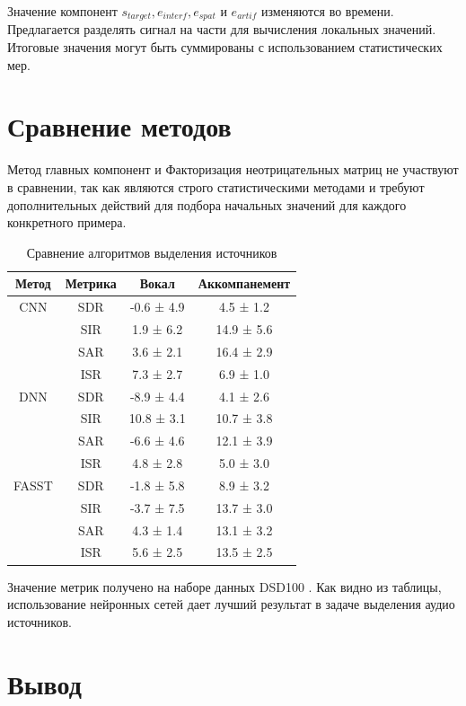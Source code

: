 Значение компонент $s_{target}, e_{interf}, e_{spat}$ и $e_{artif}$ изменяются во времени. Предлагается разделять сигнал на части для вычисления локальных значений. Итоговые значения могут быть суммированы с использованием статистических мер.

\section{Сравнение методов}

Метод главных компонент и Факторизация неотрицательных матриц не участвуют в сравнении, так как являются строго статистическими методами и требуют дополнительных действий для подбора начальных значений для каждого конкретного примера.

\begin{table}[h]
	\caption{\label{tab:canonsummary}Сравнение алгоритмов выделения источников}
	\begin{center}
		\begin{tabular}{|c|c|c|c|}
			\hline
			Метод & Метрика & Вокал & Аккомпанемент \\
			\hline
			CNN & SDR & -0.6 ± 4.9 & 4.5 ± 1.2 \\
				& SIR & 1.9 ± 6.2 & 14.9 ± 5.6 \\
				& SAR & 3.6 ± 2.1 & 16.4 ± 2.9 \\
				& ISR & 7.3 ± 2.7 & 6.9 ± 1.0 \\
			\hline
			DNN & SDR & -8.9 ± 4.4 & 4.1 ± 2.6 \\
			& SIR & 10.8 ± 3.1 & 10.7 ± 3.8 \\
			& SAR & -6.6 ± 4.6 & 12.1 ± 3.9 \\
			& ISR & 4.8 ± 2.8 & 5.0 ± 3.0 \\
			\hline
			FASST & SDR & -1.8 ± 5.8 & 8.9 ± 3.2 \\
			& SIR & -3.7 ± 7.5 & 13.7 ± 3.0 \\
			& SAR & 4.3 ± 1.4 & 13.1 ± 3.2 \\
			& ISR & 5.6 ± 2.5 & 13.5 ± 2.5 \\
			\hline
		\end{tabular}
	\end{center}
\end{table} 

Значение метрик получено на наборе данных DSD100 \cite{DSD100}. Как видно из таблицы, использование нейронных сетей дает лучший результат в задаче выделения аудио источников.

\section{Вывод}

